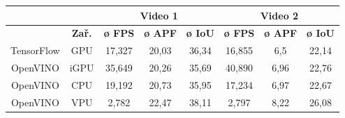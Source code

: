 \begin{table}[H]
  \centering
  \begin{tabular}{cc|ccc|ccc|}
  \cline{3-8}
                                                               &                              & \multicolumn{3}{c|}{\cellcolor[HTML]{CBCEFB}\textbf{Video 1}}                                                                              & \multicolumn{3}{c|}{\cellcolor[HTML]{CBCEFB}\textbf{Video 2}}                                                                              \\ \hline
  \rowcolor[HTML]{E0DBDB} 
  \multicolumn{1}{|c|}{\cellcolor[HTML]{E0DBDB}\textbf{Model}} & \textbf{Zař.}                & \multicolumn{1}{c|}{\cellcolor[HTML]{E0DBDB}\textbf{ø FPS}} & \multicolumn{1}{c|}{\cellcolor[HTML]{E0DBDB}\textbf{ø APF}} & \textbf{ø IoU} & \multicolumn{1}{c|}{\cellcolor[HTML]{E0DBDB}\textbf{ø FPS}} & \multicolumn{1}{c|}{\cellcolor[HTML]{E0DBDB}\textbf{ø APF}} & \textbf{ø IoU} \\ \hline
  \multicolumn{1}{|c|}{\cellcolor[HTML]{E0DBDB}TensorFlow}     & \cellcolor[HTML]{E0DBDB}GPU  & \multicolumn{1}{c|}{17,327}                                 & \multicolumn{1}{c|}{20,03}                                  & 36,34          & \multicolumn{1}{c|}{16,855}                                 & \multicolumn{1}{c|}{6,5}                                    & 22,14          \\ \hline
  \multicolumn{1}{|c|}{\cellcolor[HTML]{E0DBDB}OpenVINO}       & \cellcolor[HTML]{E0DBDB}iGPU & \multicolumn{1}{c|}{35,649}                                 & \multicolumn{1}{c|}{20,26}                                  & 35,69          & \multicolumn{1}{c|}{40,890}                                 & \multicolumn{1}{c|}{6,96}                                   & 22,76          \\ \hline
  \multicolumn{1}{|c|}{\cellcolor[HTML]{E0DBDB}OpenVINO}       & \cellcolor[HTML]{E0DBDB}CPU  & \multicolumn{1}{c|}{19,192}                                 & \multicolumn{1}{c|}{20,73}                                  & 35,95          & \multicolumn{1}{c|}{17,234}                                 & \multicolumn{1}{c|}{6,97}                                   & 22,67          \\ \hline
  \multicolumn{1}{|c|}{\cellcolor[HTML]{E0DBDB}OpenVINO}       & \cellcolor[HTML]{E0DBDB}VPU  & \multicolumn{1}{c|}{2,782}                                  & \multicolumn{1}{c|}{22,47}                                  & 38,11          & \multicolumn{1}{c|}{2,797}                                  & \multicolumn{1}{c|}{8,22}                                   & 26,08          \\ \hline

\end{tabular}
\end{table}

